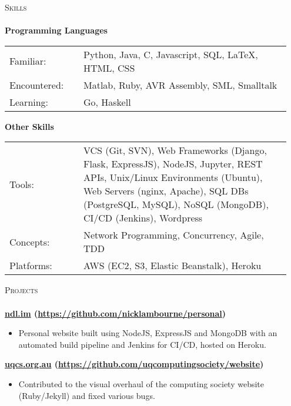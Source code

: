 \documentclass[a4paper]{article}
\newcommand{\lineunder} {
    \vspace*{-8pt} \\
    \hspace*{-18pt} \hrulefill \\
}
\newcommand{\header} [1] {
    {\hspace*{-18pt}\vspace*{6pt} \textsc{#1}}
    \vspace*{-6pt} \lineunder
}
\newenvironment{singleitem}
{   \small
    \vspace{-2.6pt}
    \begin{itemize}
    \setlength{\itemsep}{0pt}
    \setlength{\parskip}{0pt}
    \setlength{\parsep}{0pt}   }
{\end{itemize} \vspace{-2.6pt}	}
\begin{document}
\vspace{-1mm}
\header{Skills}
\textbf{Programming Languages}
\begin{tabular}{p{0.25\linewidth}p{0.7\linewidth}}
	\small Familiar: & \small Python, Java, C, Javascript, SQL, \LaTeX, HTML, CSS \\
	\small Encountered: & \small Matlab, Ruby, AVR Assembly, SML, Smalltalk   \\
	\small Learning:   & \small Go, Haskell\vspace{2mm}                                          \\	
\end{tabular}

\textbf{Other Skills}
\begin{tabular}{p{0.25\linewidth}p{0.7\linewidth}}
	\small Tools: & \small VCS (Git, SVN), Web Frameworks (Django, Flask, ExpressJS), NodeJS,  Jupyter, REST APIs, Unix/Linux Environments (Ubuntu), Web Servers (nginx, Apache), SQL DBs (PostgreSQL, MySQL), NoSQL (MongoDB), CI/CD (Jenkins), Wordpress \\
	\small Concepts: & \small Network Programming, Concurrency, Agile, TDD   \\
	\small Platforms: & \small AWS (EC2, S3, Elastic Beanstalk), Heroku  \\
\end{tabular}

\vspace{2mm}


\vspace{1mm}

\header{Projects}
\vspace{1mm}
\textbf{\href{https://ndl.im}{ndl.im} (\href{https://github.com/nicklambourne/personal}{https://github.com/nicklambourne/personal})}
\begin{singleitem}
	\item Personal website built using NodeJS, ExpressJS and MongoDB with an automated build pipeline and Jenkins for CI/CD, hosted on Heroku.
\end{singleitem}

\textbf{\href{https://uqcs.org.au}{uqcs.org.au} (\href{https://github.com/uqcomputingsociety/website}{https://github.com/uqcomputingsociety/website})}
\begin{singleitem}
	\item Contributed to the visual overhaul of the computing society website (Ruby/Jekyll) and fixed various bugs.
\end{singleitem}
\end{document}
